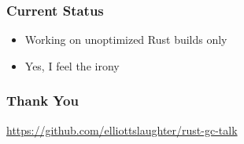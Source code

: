 \documentclass[ignorenonframetext,12pt]{beamer}
\begin{document}
\begin{frame}\frametitle{Current Status}
\large
\begin{itemize}
  \item Working on unoptimized Rust builds only
  \item Yes, I feel the irony
\end{itemize}
\end{frame}

\begin{frame}\frametitle{Thank You}
\large
\url{https://github.com/elliottslaughter/rust-gc-talk}
\end{frame}
\end{document}
